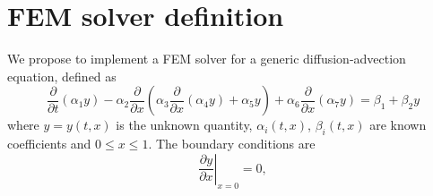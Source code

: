 \section{FEM solver definition} %
\label{sec:fem_solver}

We propose to implement a FEM solver for a generic diffusion-advection equation, defined as
\begin{equation}
\frac{\partial }{{\partial t}}\left( {{\alpha _1}y} \right) - {\alpha _2}\frac{\partial }{{\partial x}}\left( {{\alpha _3}\frac{\partial }{{\partial x}}\left( {{\alpha _4}y} \right) + {\alpha _5}y} \right) + {\alpha _6}\frac{\partial }{{\partial x}}\left( {{\alpha _7}y} \right) = {\beta _1} + {\beta _2}y
\end{equation}
where $y = y\left( t, x \right)$ is the unknown quantity, $\alpha_i\left( t, x \right)$, $\beta_i\left( t, x \right)$ are known coefficients and $0\leq x \leq 1$. The boundary conditions are
\begin{equation}
{\left. {\frac{{\partial y}}{{\partial x}}} \right|_{x = 0}} = 0,
\end{equation}
